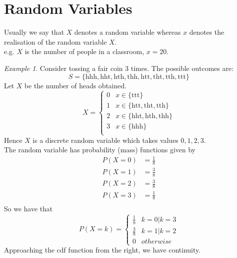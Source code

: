 \documentclass{article}
\theoremstyle{definition}
\theoremstyle{remark}
\theoremstyle{example}
\newtheorem*{example}{Example}
\begin{document}
	\section{Random Variables}
	Usually we say that $X$ denotes a random variable whereas $x$ denotes the realisation of the random variable $X$.\\
	e.g. $X$ is the number of people in a classroom, $x=20$.
	\begin{example}
		Consider tossing a fair coin $3$ times. The possible outcomes are: \[S=\{\mathrm{hhh,hht,hth,thh,htt,tht,tth,ttt}\}\]
		Let $X$ be the number of heads obtained.\\
		\[ X=\begin{cases}
			0 & x \in \{\mathrm{ttt}\}\\
			1 & x \in \{\mathrm{htt,tht,tth}\}\\
			2 & x \in \{\mathrm{hht,hth,thh}\}\\
			3 & x \in \{\mathrm{hhh}\}\\
		\end{cases}\]
		Hence $X$ is a discrete random variable which takes values $0,1,2,3$.\\
		The random variable has probability (mass) functions given by \begin{align*}
			P(X=0) & = \tfrac{1}{8}\\
			P(X=1) & = \tfrac{3}{8}\\
			P(X=2) & = \tfrac{3}{8}\\
			P(X=3) & = \tfrac{1}{8}\\
		\end{align*}
		So we have that \[P(X=k) = \begin{cases}
			\tfrac{1}{8} & k=0 | k=3\\
			\tfrac{3}{8} & k=1 | k=2\\
			0 & otherwise
		\end{cases}\]
		Approaching the cdf function from the right, we have continuity.
	\end{example}
\end{document}
